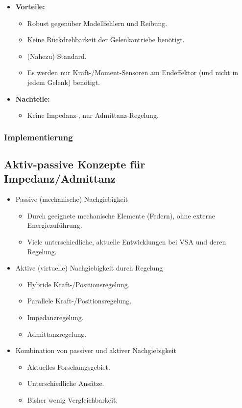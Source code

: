 		\begin{itemize}
			\item \textbf{Vorteile:}
				\begin{itemize}
					\item Robust gegenüber Modellfehlern und Reibung.
					\item Keine Rückdrehbarkeit der Gelenkantriebe benötigt.
					\item (Nahezu) Standard.
					\item Es werden nur Kraft-/Moment-Sensoren am Endeffektor (und nicht in jedem Gelenk) benötigt.
				\end{itemize}
			\item \textbf{Nachteile:}
				\begin{itemize}
					\item Keine Impedanz-, nur Admittanz-Regelung.
				\end{itemize}
		\end{itemize}

		\subsubsection{Implementierung} %

	\subsection{Aktiv-passive Konzepte für Impedanz/Admittanz}
		\begin{itemize}
			\item Passive (\bzw mechanische) Nachgiebigkeit
				\begin{itemize}
					\item Durch geeignete mechanische Elemente (\zB Federn), ohne externe Energiezuführung.
					\item Viele unterschiedliche, aktuelle Entwicklungen bei VSA und deren Regelung.
				\end{itemize}
			\item Aktive (\bzw virtuelle) Nachgiebigkeit durch Regelung
				\begin{itemize}
					\item Hybride Kraft-/Positionsregelung.
					\item Parallele Kraft-/Positionsregelung.
					\item Impedanzregelung.
					\item Admittanzregelung.
				\end{itemize}
			\item Kombination von passiver und aktiver Nachgiebigkeit
				\begin{itemize}
					\item Aktuelles Forschungsgebiet.
					\item Unterschiedliche Ansätze.
					\item Bisher wenig Vergleichbarkeit.
				\end{itemize}
		\end{itemize}


